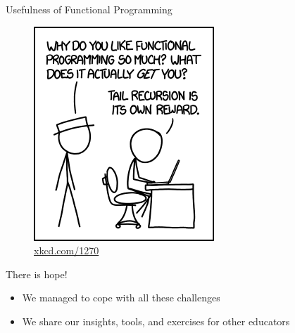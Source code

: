 \documentclass{beamer}
\begin{document}
\begin{frame}{Usefulness of Functional Programming}
{\begin{multicols}{2}
\begin{figure}
\includegraphics[width=0.8\linewidth]{assets/xkcd_tailrec}
\caption*{\url{xkcd.com/1270}}
\end{figure}
\end{multicols}
}
\end{frame}

\begin{frame}
\centerline{\alert{\huge{There is hope!}}}
\begin{itemize}[<+->]
\item We managed to cope with all these challenges
\item We share our insights, tools, and exercises for other educators
\end{itemize}

\end{frame}


\end{document}
